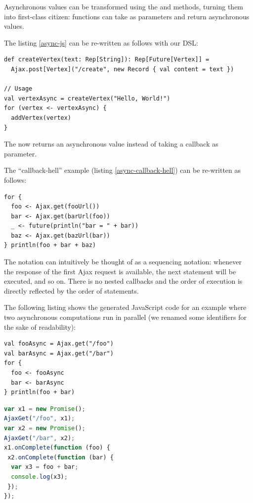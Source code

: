 \documentclass[american,english,runningheads]{llncs}
\begin{document}
Asynchronous values can be transformed using the  and  methods, turning them into first-class citizen: functions can take as parameters and return asynchronous values.

The listing \ref{async-js} can be re-written as follows with our DSL:

\begin{lstlisting}
def createVertex(text: Rep[String]): Rep[Future[Vertex]] =
  Ajax.post[Vertex]("/create", new Record { val content = text })

// Usage
val vertexAsync = createVertex("Hello, World!")
for (vertex <- vertexAsync) {
  addVertex(vertex)
}
\end{lstlisting}

The  now returns an asynchronous value instead of taking a callback as parameter.

The “callback-hell” example (listing \ref{async-callback-hell}) can be re-written as follows:

\begin{lstlisting}
for {
  foo <- Ajax.get(fooUrl())
  bar <- Ajax.get(barUrl(foo))
  _ <- future(println("bar = " + bar))
  baz <- Ajax.get(bazUrl(bar))
} println(foo + bar + baz)
\end{lstlisting}

The  notation can intuitively be thought of as a sequencing notation: whenever the response of the first Ajax request is available, the next statement will be executed, and so on. There is no nested callbacks and the order of execution is directly reflected by the order of statements.

The following listing shows the generated JavaScript code for an example where two asynchronous computations run in parallel (we renamed some identifiers for the sake of readability):

\begin{multicols}{2}
\begin{lstlisting}[caption=Parallel computations in Scala]
val fooAsync = Ajax.get("/foo")
val barAsync = Ajax.get("/bar")
for {
  foo <- fooAsync
  bar <- barAsync
} println(foo + bar)
\end{lstlisting}
\vfill
\columnbreak
\begin{lstlisting}[language=JavaScript,caption=Generated JavaScript code]
var x1 = new Promise();
AjaxGet("/foo", x1);
var x2 = new Promise();
AjaxGet("/bar", x2);
x1.onComplete(function (foo) {
 x2.onComplete(function (bar) {
  var x3 = foo + bar;
  console.log(x3);
 });
});
\end{lstlisting}
\end{multicols}
\end{document}
